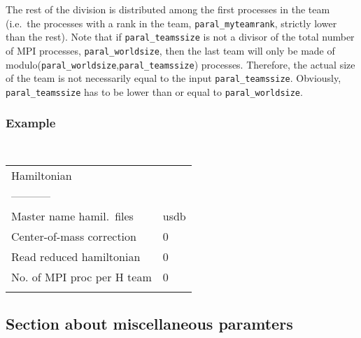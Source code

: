 \documentclass[a4paper,11pt]{article}
\newcommand{\ttt}[1]{\texttt{#1}}
\begin{document}
\begin{itemize}
             The rest of the division is distributed among the first processes in the team (i.e.\ the processes with a rank in the team,
             \ttt{paral\_myteamrank}, strictly lower than the rest).
             Note that if \ttt{paral\_teamssize} is not a divisor of the total number of MPI processes, \ttt{paral\_worldsize}, then the last team
             will only be made of modulo(\ttt{paral\_worldsize},\ttt{paral\_teamssize}) processes. Therefore, the actual size of the team is not 
             necessarily equal to the input \ttt{paral\_teamssize}.
             Obviously, \ttt{paral\_teamssize} has to be lower than or equal to \ttt{paral\_worldsize}. \\[0.05cm]
\end{itemize}

\subsubsection*{Example}
\begin{center}
\tt
\begin{tabular}{|ll|}
\hline
Hamiltonian                   &     \\
-----------                   &     \\
Master name hamil.\ files     &usdb \\
Center-of-mass correction     &0    \\
Read reduced hamiltonian      &0    \\
No. of MPI proc per H team    &0    \\
                              &     \\
\hline
\end{tabular}
\end{center}

%
%
\subsection{Section about miscellaneous paramters}
\end{document}
